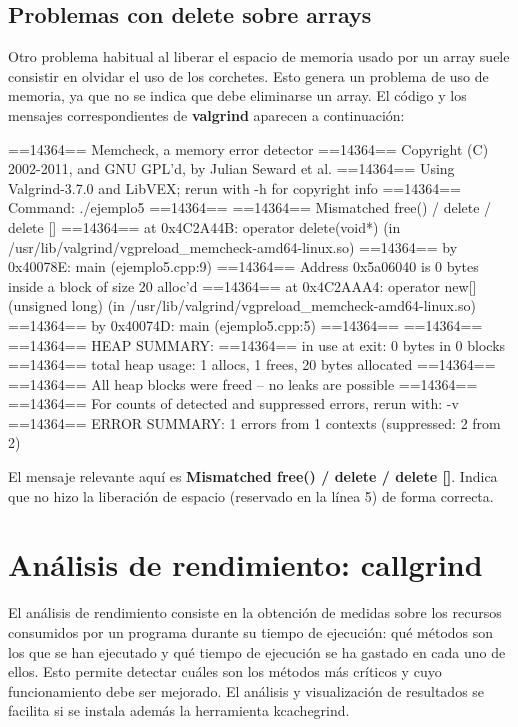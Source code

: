 \documentclass[11pt,a4paper,professionalfonts]{article}
\begin{document}
\subsection{Problemas con delete sobre arrays}

Otro problema habitual al liberar el espacio de memoria usado por un
array suele consistir en olvidar el uso de los corchetes. Esto genera
un problema de uso de memoria, ya que no se indica que debe eliminarse
un array. El código y los mensajes correspondientes de \textbf{valgrind} 
aparecen a continuación:


\vspace{0.4cm}
\begin{javacode}
==14364== Memcheck, a memory error detector
==14364== Copyright (C) 2002-2011, and GNU GPL'd, by Julian Seward et al.
==14364== Using Valgrind-3.7.0 and LibVEX; rerun with -h for copyright info
==14364== Command: ./ejemplo5
==14364== 
==14364== Mismatched free() / delete / delete []
==14364==    at 0x4C2A44B: operator delete(void*) (in /usr/lib/valgrind/vgpreload_memcheck-amd64-linux.so)
==14364==    by 0x40078E: main (ejemplo5.cpp:9)
==14364==  Address 0x5a06040 is 0 bytes inside a block of size 20 alloc'd
==14364==    at 0x4C2AAA4: operator new[](unsigned long) (in /usr/lib/valgrind/vgpreload_memcheck-amd64-linux.so)
==14364==    by 0x40074D: main (ejemplo5.cpp:5)
==14364== 
==14364== 
==14364== HEAP SUMMARY:
==14364==     in use at exit: 0 bytes in 0 blocks
==14364==   total heap usage: 1 allocs, 1 frees, 20 bytes allocated
==14364== 
==14364== All heap blocks were freed -- no leaks are possible
==14364== 
==14364== For counts of detected and suppressed errors, rerun with: -v
==14364== ERROR SUMMARY: 1 errors from 1 contexts (suppressed: 2 from 2)
\end{javacode}
\vspace{0.4cm}

El mensaje relevante aquí es \textbf{Mismatched free() / delete / delete []}.
Indica que no hizo la liberación de espacio (reservado en la línea 5) de forma
correcta.

\section{Análisis de rendimiento: callgrind}

El análisis de rendimiento consiste en la obtención de medidas sobre los
recursos consumidos por un programa durante su tiempo de ejecución: qué
métodos son los que se han ejecutado y qué tiempo de ejecución se ha gastado
en cada uno de ellos. Esto permite detectar cuáles son los métodos más
críticos y cuyo funcionamiento debe ser mejorado. El análisis y visualización
de resultados se facilita si se instala además la herramienta kcachegrind. 
\end{document}
